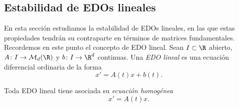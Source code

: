 \subsection{Estabilidad de EDOs lineales}

En esta sección estudiamos la estabilidad de EDOs lineales, en las que estas propiedades tendrán su
contraparte en términos de matrices fundamentales. Recordemos en este punto el concepto de EDO
lineal. Sean $I \subset \R$ abierto, $A \colon I \to \mathcal{M}_{d}(\R)$ y $b \colon I \to \R^d$
continuas.  Una \emph{EDO lineal} es una ecuación diferencial ordinaria de la forma
\begin{equation}
  \label{eq:lineal}
  x' = A(t)x + b(t).
  \tag{EL}
\end{equation}

Toda EDO lineal tiene asociada su \emph{ecuación homogénea }
\begin{equation}
  \label{eq:lineal:hom}
  x' = A(t)x.
  \tag{ELH}
\end{equation}

